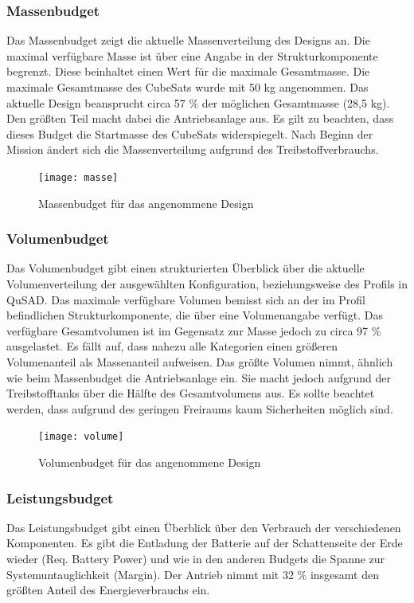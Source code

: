						\subsubsection{Massenbudget}
Das Massenbudget  zeigt die aktuelle Massenverteilung des Designs an. Die maximal verfügbare Masse ist über eine Angabe in der Strukturkomponente begrenzt. Diese beinhaltet einen Wert für die maximale Gesamtmasse. Die maximale Gesamtmasse des CubeSats wurde mit 50 kg angenommen. Das aktuelle Design beansprucht circa 57 \% der möglichen Gesamtmasse (28,5 kg). Den größten Teil macht dabei die Antriebsanlage aus. Es gilt zu beachten, dass dieses Budget die Startmasse des CubeSats widerspiegelt. Nach Beginn der Mission ändert sich die Massenverteilung aufgrund des Treibstoffverbrauchs.\\
										\begin{figure}[!h]
											\centering
												\texttt{[image: masse]}
											\caption{Massenbudget für das angenommene Design}
											\label{fig:masse}
										\end{figure}
\newpage								
						\subsubsection{Volumenbudget}
Das Volumenbudget  gibt einen strukturierten Überblick über die aktuelle Volumenverteilung der ausgewählten Konfiguration, beziehungsweise des Profils in QuSAD. Das maximale verfügbare Volumen bemisst sich an der im Profil befindlichen Strukturkomponente, die über eine Volumenangabe verfügt. Das verfügbare Gesamtvolumen ist im Gegensatz zur Masse jedoch zu circa 97 \% ausgelastet. Es fällt auf, dass nahezu alle Kategorien einen größeren Volumenanteil als Massenanteil aufweisen. Das größte Volumen nimmt, ähnlich wie beim Massenbudget die Antriebsanlage ein. Sie macht jedoch aufgrund der Treibstofftanks über die Hälfte des Gesamtvolumens aus. Es sollte beachtet werden, dass aufgrund des geringen Freiraums kaum Sicherheiten möglich sind.\\
								
										\begin{figure}[!h]
											\centering
												\texttt{[image: volume]}
											\caption{Volumenbudget für das angenommene Design}
											\label{fig:volume}
										\end{figure}
\newpage								
						\subsubsection{Leistungsbudget}
Das Leistungsbudget  gibt einen Überblick über den Verbrauch der verschiedenen Komponenten. Es gibt die Entladung der Batterie auf der Schattenseite der Erde wieder (Req. Battery Power) und wie in den anderen Budgets die Spanne zur Systemuntauglichkeit (Margin). Der Antrieb nimmt mit 32 \% insgesamt den größten Anteil des Energieverbrauchs ein.\\
				
